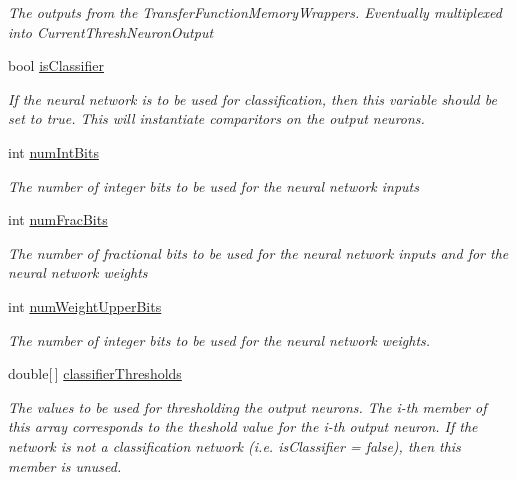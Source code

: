 \begin{DoxyCompactItemize}
\begin{DoxyCompactList}\small\item\em The outputs from the Transfer\+Function\+Memory\+Wrappers. Eventually multiplexed into Current\+Thresh\+Neuron\+Output \end{DoxyCompactList}\item 
bool \hyperlink{class_n_n_gen_1_1_sync_neural_network_ac4b6c7f973b66d41e7e12795b027887d}{is\+Classifier}
\begin{DoxyCompactList}\small\item\em If the neural network is to be used for classification, then this variable should be set to true. This will instantiate comparitors on the output neurons. \end{DoxyCompactList}\item 
int \hyperlink{class_n_n_gen_1_1_sync_neural_network_a66e287c50de3ae1932ea768fc3fa54fc}{num\+Int\+Bits}
\begin{DoxyCompactList}\small\item\em The number of integer bits to be used for the neural network inputs \end{DoxyCompactList}\item 
int \hyperlink{class_n_n_gen_1_1_sync_neural_network_a82e208d521ab24cb49b0fdfa1ed285c1}{num\+Frac\+Bits}
\begin{DoxyCompactList}\small\item\em The number of fractional bits to be used for the neural network inputs and for the neural network weights \end{DoxyCompactList}\item 
int \hyperlink{class_n_n_gen_1_1_sync_neural_network_afe97a4c00e87742409fe9a5a16922822}{num\+Weight\+Upper\+Bits}
\begin{DoxyCompactList}\small\item\em The number of integer bits to be used for the neural network weights. \end{DoxyCompactList}\item 
double\mbox{[}$\,$\mbox{]} \hyperlink{class_n_n_gen_1_1_sync_neural_network_ad044d0ce18e20de41ea9c30ad30b96b1}{classifier\+Thresholds}
\begin{DoxyCompactList}\small\item\em The values to be used for thresholding the output neurons. The i-\/th member of this array corresponds to the theshold value for the i-\/th output neuron. If the network is not a classification network (i.\+e. is\+Classifier = false), then this member is unused. \end{DoxyCompactList}\end{DoxyCompactItemize}


